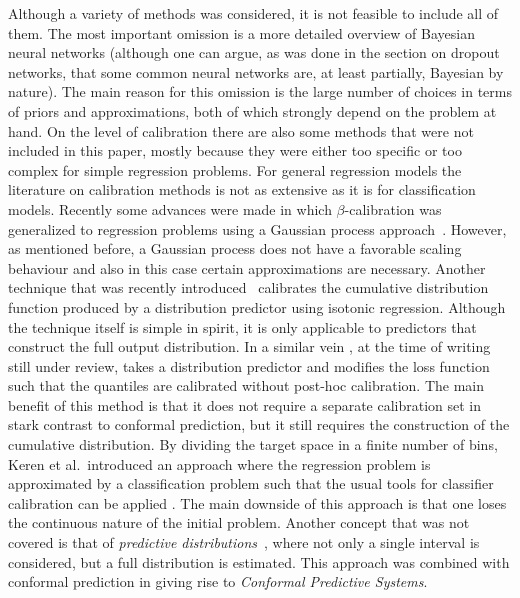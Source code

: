 \documentclass[smallcondensed]{svjour3}
\begin{document}
    Although a variety of methods was considered, it is not feasible to include all of them. The most important omission is a more detailed overview of Bayesian neural networks (although one can argue, as was done in the section on dropout networks, that some common neural networks are, at least partially, Bayesian by nature). The main reason for this omission is the large number of choices in terms of priors and approximations, both of which strongly depend on the problem at hand. On the level of calibration there are also some methods that were not included in this paper, mostly because they were either too specific or too complex for simple regression problems. For general regression models the literature on calibration methods is not as extensive as it is for classification models. Recently some advances were made in which $\beta$-calibration \cite{pmlr-v54-kull17a} was generalized to regression problems using a Gaussian process approach~\cite{pmlr-v97-song19a}. However, as mentioned before, a Gaussian process does not have a favorable scaling behaviour and also in this case certain approximations are necessary. Another technique that was recently introduced~\cite{pmlr-v80-kuleshov18a} calibrates the cumulative distribution function produced by a distribution predictor using isotonic regression. Although the technique itself is simple in spirit, it is only applicable to predictors that construct the full output distribution. In a similar vein \cite{utpala2020quantile}, at the time of writing still under review, takes a distribution predictor and modifies the loss function such that the quantiles are calibrated without post-hoc calibration. The main benefit of this method is that it does not require a separate calibration set in stark contrast to conformal prediction, but it still requires the construction of the cumulative distribution. By dividing the target space in a finite number of bins, Keren et al.\ introduced an approach where the regression problem is approximated by a classification problem such that the usual tools for classifier calibration can be applied \cite{keren2018calibrated}. The main downside of this approach is that one loses the continuous nature of the initial problem. Another concept that was not covered is that of \textit{predictive distributions}~\cite{schweder2016confidence,shen2018prediction}, where not only a single interval is considered, but a full distribution is estimated. This approach was combined with conformal prediction in \cite{vovk2017nonparametric} giving rise to \textit{Conformal Predictive Systems}.
\end{document}
